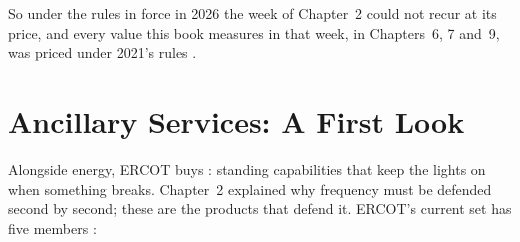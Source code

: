 So under the rules in force in 2026 the week of Chapter~2 could not recur at its price, and every value this book measures in that week, in Chapters~6, 7 and~9, was priced under 2021's rules \autocite{puct25509}. %

\section{Ancillary Services: A First Look}
\label{sec:as-overview}

Alongside energy, ERCOT buys : standing capabilities that keep the lights on when something breaks. Chapter~2 explained why frequency must be defended second by second; these are the products that defend it. ERCOT's current set has five members \autocite{ercot2025astopics}: %

